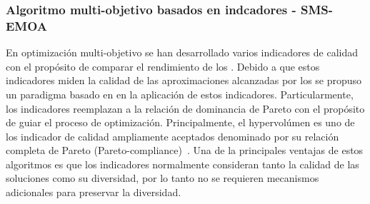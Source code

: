\subsubsection{Algoritmo multi-objetivo basados en indcadores - SMS-EMOA}

En optimización multi-objetivo se han desarrollado varios indicadores de calidad con el propósito de comparar el rendimiento de los \MOEAS{}.
%
Debido a que estos indicadores miden la calidad de las aproximaciones alcanzadas por los \MOEAS{} se propuso un paradigma basado en en la aplicación de estos indicadores.
%
Particularmente, los indicadores reemplazan a la relación de dominancia de Pareto con el propósito de guiar el proceso de optimización.
%
Principalmente, el hypervolúmen es uno de los indicador de calidad ampliamente aceptados denominado por su relación completa de Pareto (Pareto-compliance)~\cite{Joel:IGDPlus_And_GDPlus}.
%
Una de la principales ventajas de estos algoritmos es que los indicadores normalmente consideran tanto la calidad de las soluciones como su diversidad, por lo tanto no se requieren mecanismos adicionales para preservar la diversidad.
%

